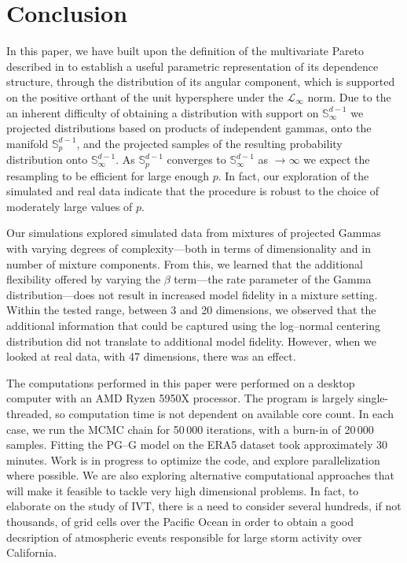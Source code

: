 \section{Conclusion\label{sec:conclusion}}
In this paper, we have built upon the definition of the multivariate Pareto described in \cite{ferreira2014}
  to establish a useful parametric representation of its dependence structure, through
  the distribution of its angular component, which is supported on the positive orthant of the unit
  hypersphere under the $\mathcal{L}_{\infty}$ norm.  Due to the an
  inherent difficulty of obtaining a distribution with support on ${\mathbb S}^{d-1}_\infty$
  we projected distributions based on products of independent gammas, 
  onto the manifold
  ${\mathbb S}_{p}^{d-1}$, and the projected samples of the resulting
  probability distribution onto ${\mathbb S}_{\infty}^{d-1}$.  
  As ${\mathbb S}_{p}^{d-1}$ converges to ${\mathbb S}_{\infty}^{d-1}$ as $
  \to\infty$ we expect the resampling to be efficient for large enough
  $p$. In fact, our exploration of the simulated and real data indicate
  that the procedure is robust to the choice of moderately large values
  of $p$. 
 
Our simulations explored simulated data from
    mixtures of projected Gammas with varying degrees of complexity---both in terms of dimensionality and 
    in number of mixture components.  From this, we learned that the additional flexibility 
    offered by varying the $\beta$ term---the rate parameter of the Gamma distribution---does not result 
    in increased model fidelity in a mixture setting.  Within the tested range, between 3 and 20 
    dimensions, we observed that the additional information that could be captured using the log--normal 
    centering distribution did not translate to additional model fidelity.  However, when we looked at 
    real data, with 47 dimensions, there was an effect.
    
The computations performed in this paper were performed on a desktop computer with an AMD Ryzen 5950X processor.
  The program is largely single-threaded, so computation time is not dependent on available core count.  In each
  case, we run the MCMC chain for 50\,000 iterations, with a burn-in of 20\,000 samples.  Fitting the PG--G model
  on the ERA5 dataset took approximately 30 minutes.  Work is in progress to optimize the code, and explore
  parallelization where possible.  We are also exploring alternative computational approaches that will make it
  feasible to tackle very high dimensional problems. In fact, to elaborate on the study of IVT, there is a need 
  to consider several hundreds, if not thousands, of grid cells over the Pacific Ocean in order to obtain a 
  good decsription of atmospheric events responsible for large storm activity over California.



